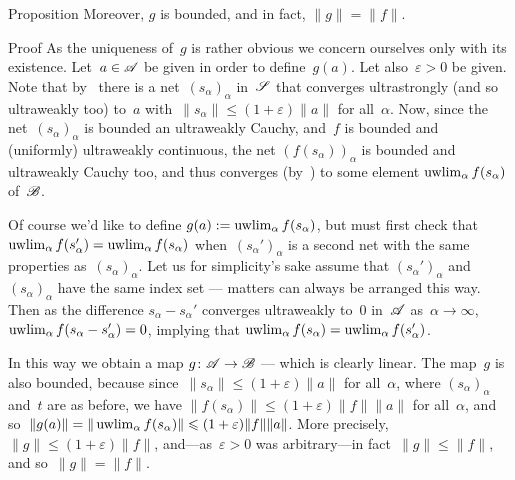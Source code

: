 \documentclass[a]{subfiles}
\begin{document}
\begin{parsec}
\begin{point}[vn-extension]{Proposition}
Moreover, $g$ is bounded,
and in fact,  $\|g\|=\|f\|$.
\begin{point}{Proof}%
As the uniqueness of~$g$ is rather obvious
we concern ourselves only with its existence.
Let~$a\in\mathscr{A}$ be given
in order to define~$g(a)$.
Let also~$\varepsilon>0$ be given.
Note that by~ 
there is a net~$(s_\alpha)_\alpha$
in~$\mathscr{S}$
that converges ultrastrongly (and so ultraweakly too)
to~$a$
with~$\|s_\alpha \|\leq(1+\varepsilon)\|a\|$
for all~$\alpha$.
Now,
since the net~$(s_\alpha)_\alpha$
is bounded an ultraweakly Cauchy,
and~$f$ is bounded and (uniformly) ultraweakly continuous,
the net
$(f(s_\alpha))_\alpha$
is bounded and ultraweakly Cauchy too,
and thus converges (by~)
to some element
$\uwlim_\alpha f(s_\alpha)$
of~$\mathscr{B}$.

\begin{point}%
Of course we'd like to define $g(a):=\uwlim_\alpha
f(s_\alpha)$,
but must first check
that $\uwlim_\alpha f(s_\alpha')
=\uwlim_\alpha f(s_\alpha)$
when~$(s_\alpha')_\alpha$ is a second net with the same properties
as~$(s_\alpha)_\alpha$.
Let us for simplicity's sake
assume that $(s_\alpha')_\alpha$ and~$(s_\alpha)_\alpha$
have the same index set
--- matters can always be arranged this way.
Then as the difference $s_\alpha-s_\alpha'$
converges ultraweakly to~$0$ in~$\mathscr{A}$ as~$\alpha\to\infty$,
$\uwlim_\alpha f(s_\alpha-s_\alpha')=0$,
implying that $\uwlim_\alpha f(s_\alpha)
= \uwlim_\alpha f(s_\alpha')$.
\end{point}
\begin{point}%
In this way
we obtain a map $g \colon \mathscr{A}\to\mathscr{B}$
--- which is clearly linear.
The map~$g$ is also bounded,
because since~$\|s_\alpha\|\leq (1+\varepsilon)\|a\|$
for all~$\alpha$,
where $(s_\alpha)_\alpha$ and~$t$ are as before,
we have $\|f (s_\alpha)\|\leq (1+\varepsilon) \|f\|\|a\|$
for all~$\alpha$,
and so~$\|g(a)\|=\|\uwlim_\alpha f(s_\alpha)\|
\leq (1+\varepsilon) \|f \|\|a\|$.
More precisely, $\|g\|\leq (1+\varepsilon)\|f\|$,
and---as~$\varepsilon>0$ was arbitrary---in 
fact~$\|g\|\leq \|f\|$, and so~$\|g\|=\|f\|$.


\end{point}
\end{point}
\end{point}
\end{parsec}
\end{document}
